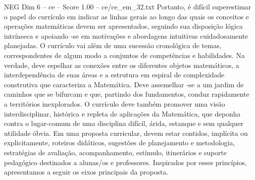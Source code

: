 \begin{textsample}{NEG Dim 6 – ce – Score 1.00 – ce/ce\_em\_32.txt}
Portanto, é difícil superestimar o papel do currículo em indicar as linhas gerais ao longo das quais os conceitos e operações matemáticas devem ser apresentados, seguindo sua disposição lógica intrínseca e apoiando -se em motivações e abordagens intuitivas cuidadosamente planejadas.
O currículo vai além de uma sucessão cronológica de temas, correspondentes de algum modo a conjuntos de competências e habilidades.
Na verdade, deve espelhar as conexões entre os diferentes objetos matemáticos, a interdependência de suas áreas e a estrutura em espiral de complexidade construtiva que caracteriza a Matemática.
Deve assemelhar -se a um jardim de caminhos que se bifurcam e que, partindo dos fundamentos, conduz rapidamente a territórios inexplorados.
O currículo deve também promover uma visão interdisciplinar, histórica e repleta de aplicações da Matemática, que deponha contra o lugar-comum de uma disciplina difícil, árida, estanque e sem qualquer utilidade óbvia.
Em uma proposta curricular, devem estar contidos, implícita ou explicitamente, roteiros didáticos, sugestões de planejamento e metodologia, estratégias de avaliação, acompanhamento, estímulo, itinerários e suporte pedagógico destinados a alunas/os e professores.
Inspirados por esses princípios, apresentamos a seguir os eixos principais da proposta.

\end{textsample}
